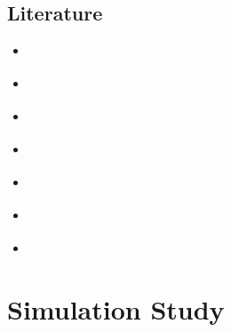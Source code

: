\documentclass[11pt,twoside,a4paper]{article}
\begin{document}


	\subsection{Literature}
	\begin{itemize}
		\item \cite{alexanderian_KLexpansion_2015}
		\item \cite{kokoszka_introduction_2017}
		\item \cite{hsing_theoretical_2015}
		\item \cite{ramsay_functional_2005}
		\item \cite{horvath_inference_2012}
		\item \cite{cai_prediction_2006}
		\item \cite{levitin_introduction_2007}
	\end{itemize}
	
	\newpage
	\section{Simulation Study}
	
\end{document}
